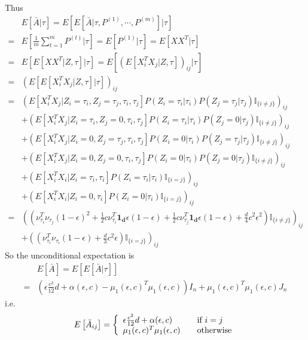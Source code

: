 \documentclass[a4paper]{article}
\begin{document}
Thus
\begin{align*}
	& E\left[ \bar{A} | \tau \right] = E \left[ E \left[ \bar{A} | \tau, P^{(1)}, \cdots, P^{(m)} \right] |\tau \right] \\
    = & E \left[ \frac{1}{m} \sum_{t=1}^m P^{(t)} | \tau \right] = E[P^{(1)}|\tau] = E \left[ X X^T | \tau \right] \\
    = & E \left[ E \left[ X X^T | Z, \tau \right] | \tau \right]
    = E \left[ \left( E \left[ X_i^T X_j | Z, \tau \right] \right)_{ij} | \tau \right] \\
    = & \left( E \left[  E \left[ X_i^T X_j | Z, \tau \right] | \tau \right] \right)_{ij} \\
    = & \left( E \left[ X_i^T X_j | Z_i = \tau_i, Z_j = \tau_j, \tau_i, \tau_j \right] P \left( Z_i = \tau_i | \tau_i \right) P \left( Z_j = \tau_j | \tau_j \right)
\mathbb{I}_{\{ i \ne j\}} \right)_{ij}  \\
    & + \left( E \left[ X_i^T X_j | Z_i = \tau_i, Z_j = 0, \tau_i, \tau_j \right] P \left( Z_i = \tau_i | \tau_i \right) P \left( Z_j = 0 | \tau_j \right) \mathbb{I}_{\{ i \ne j\}} \right)_{ij} \\
    & + \left( E \left[ X_i^T X_j | Z_i = 0, Z_j = \tau_j, \tau_i, \tau_j \right] P \left( Z_i = 0 | \tau_i \right) P \left( Z_j = \tau_j | \tau_j \right) \mathbb{I}_{\{ i \ne j\}} \right)_{ij} \\
    & + \left( E \left[ X_i^T X_j | Z_i = 0, Z_j = 0, \tau_i, \tau_j \right] P \left( Z_i = 0 | \tau_i \right) P \left( Z_j = 0 | \tau_j \right) \mathbb{I}_{\{ i \ne j\}} \right)_{ij} \\
    & + \left( E \left[ X_i^T X_i | Z_i = \tau_i, \tau_i \right] P \left( Z_i = \tau_i | \tau_i \right) \mathbb{I}_{\{ i = j\}} \right)_{ij}\\
    & + \left( E \left[ X_i^T X_i | Z_i = 0, \tau_i \right] P \left( Z_i = 0 | \tau_i \right) \mathbb{I}_{\{ i = j\}} \right)_{ij}\\
    = & \left( \left( \nu_{\tau_i}^T \nu_{\tau_j} (1-\epsilon)^2 + \frac{1}{2} c \nu_{\tau_i}^T \boldsymbol{1_d} \epsilon (1-\epsilon) + \frac{1}{2} c \nu_{\tau_j}^T \boldsymbol{1_d} \epsilon(1-\epsilon) + \frac{d}{4} c^2 \epsilon^2 \right) \mathbb{I}_{\{ i \ne j\}} \right)_{ij} \\
    & + \left( \left( \nu_{\tau_i}^T \nu_{\tau_i} (1-\epsilon) + \frac{d}{3} c^2 \epsilon \right) \mathbb{I}_{\{ i = j\}} \right)_{ij}
\end{align*}
So the unconditional expectation is
\begin{align*}
	& E \left[ \bar{A} \right] = E \left[ E \left[ \bar{A} | \tau \right] \right] \\
    = & \left( \epsilon \frac{c^2}{12} d + \alpha(\epsilon, c) - \mu_1(\epsilon, c)^T \mu_1(\epsilon, c) \right) I_n + \mu_1(\epsilon, c)^T \mu_1(\epsilon, c) J_n
\end{align*}
i.e.
\[
    E \left[ \bar{A}_{ij} \right] = \left\{
    \begin{array}{l l}
        \epsilon \frac{c^2}{12} d + \alpha(\epsilon, c) & \quad \text{if $i = j$}\\
        \mu_1(\epsilon, c)^T \mu_1(\epsilon, c) & \quad \text{otherwise}
    \end{array}
    \right.
\]
\end{document}
